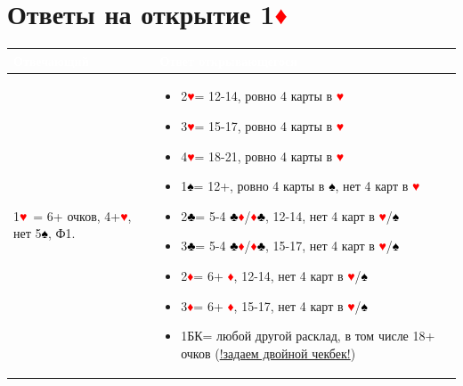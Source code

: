 \documentclass[a4paper,10pt]{article}
\newcommand{\clb}{\textcolor{black}{♣}}
\newcommand{\dia}{\textcolor{red}{♦}}
\newcommand{\hrt}{\textcolor{red}{♥}}
\newcommand{\spd}{\textcolor{black}{♠}}
\newcommand{\NT}{БК}
\begin{document}
\section{Ответы на открытие 1\dia}
\noindent
\begin{tabularx}{\textwidth}{|X|X|}
\hline
\rowcolor{tableHeader} \textcolor{white}{\textbf{Отвечающий}} & \textcolor{white}{\textbf{Ответ открывающегося}} \\ \hline
1\hrt\ = 6+ очков, 4+\hrt, нет 5\spd, Ф1. & \begin{itemize}[label=\textcolor{sputnikRed}{\tiny\(\blacksquare\)}, leftmargin=*, nosep]
    \item 2\hrt = 12-14, ровно 4 карты в \hrt
    \item 3\hrt = 15-17, ровно 4 карты в \hrt
    \item 4\hrt = 18-21, ровно 4 карты в \hrt
    \item 1\spd = 12+, ровно 4 карты в \spd, нет 4 карт в \hrt
    \item 2\clb = 5-4 \clb\dia/\dia\clb, 12-14, нет 4 карт в \hrt/\spd
    \item 3\clb = 5-4 \clb\dia/\dia\clb, 15-17, нет 4 карт в \hrt/\spd
    \item 2\dia = 6+ \dia, 12-14, нет 4 карт в \hrt/\spd
    \item 3\dia = 6+ \dia, 15-17, нет 4 карт в \hrt/\spd
    \item 1\NT = любой другой расклад, в том числе 18+ очков (\hyperlink{sec:double-checkback}{!задаем двойной чекбек!})
\end{itemize} \\ \hline


\end{tabularx}
\end{document}
